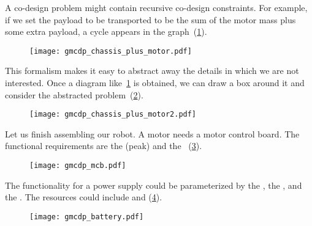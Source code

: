 \begin{example}
  


A co-design problem might contain recursive co-design constraints.
  For example, if we set the payload to be transported to be the sum
  of the motor mass plus some extra payload, a cycle appears in the
  graph~(\cref{fig:gmcdp_chassis_plus_motor}).


  \begin{figure}[h]
    \centering{}\texttt{[image: gmcdp\_chassis\_plus\_motor.pdf]}
    \caption{\label{fig:gmcdp_chassis_plus_motor}}
  \end{figure}

  This formalism makes it easy to abstract away the details
  in which we are not interested. Once a diagram like~\cref{fig:gmcdp_chassis_plus_motor}
  is obtained, we can draw a box around it and consider the abstracted
  problem~(\cref{fig:gmcdp_chassis_plus_motor-1}).

  \begin{figure}[h]
    \centering
    \texttt{[image: gmcdp\_chassis\_plus\_motor2.pdf]}
    \caption{\label{fig:gmcdp_chassis_plus_motor-1}}
  \end{figure}


  \label{exa:finish}Let us finish assembling our robot. A motor needs
  a motor control board. The functional requirements are the (peak)
   and the ~(\cref{fig:mcb}).

  \begin{figure}[h]
    \centering
    \texttt{[image: gmcdp\_mcb.pdf]}
    \caption{\label{fig:mcb}}
  \end{figure}


  \noindent The functionality for a power supply could be parameterized
  by the , the , and the .
  The resources could include  and  (\cref{fig:example-ba}).

  \begin{figure}[h]
    \centering
    \texttt{[image: gmcdp\_battery.pdf]}
    \caption{\label{fig:example-ba}}
  \end{figure}


\end{example}
